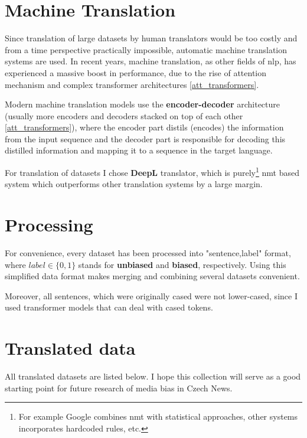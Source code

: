  
 
 
 
\section{Machine Translation}\label{DeepL}
Since translation of large datasets by human translators would be too costly and from a time perspective practically impossible, automatic machine translation systems are used. In recent years, machine translation, as other fields of \Gls{nlp}, has experienced a massive boost in performance, due to the rise of attention mechanism and complex transformer architectures \ref{att_transformers}.

Modern machine translation models use the \textbf{encoder-decoder} architecture (usually more encoders and decoders stacked on top of each other \ref{att_transformers}), where the encoder part distils (encodes) the information from the input sequence and the decoder part is responsible for decoding this distilled information and mapping it to a sequence in the target language.

For translation of datasets I chose \textbf{DeepL} translator, which is purely\footnote{For example Google combines \Gls{nmt} with statistical approaches, other systems incorporates hardcoded rules, etc.} \Gls{nmt} based system which outperforms other translation systems by a large margin.






\section{Processing}\label{processing}
For convenience, every dataset has been processed into "sentence,label" format, where $label \in \{0,1\}$ stands for \textbf{unbiased} and \textbf{biased}, respectively. Using this simplified data format makes merging and combining several datasets convenient.
    
Moreover, all sentences, which were originally cased were not lower-cased, since I used transformer models that can deal with cased tokens.

\newpage
\section{Translated data}
All translated datasets are listed below. I hope this collection will serve as a good starting point for future research of media bias in Czech News.

